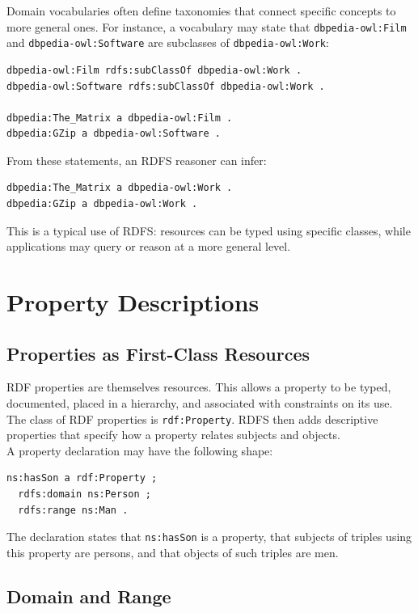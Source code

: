 \documentclass{scrbook}
\begin{document}
	Domain vocabularies often define taxonomies that connect specific concepts to more general ones. For instance, a vocabulary may state that \texttt{dbpedia-owl:Film} and \texttt{dbpedia-owl:Software} are subclasses of \texttt{dbpedia-owl:Work}:
	
	\begin{lstlisting}
dbpedia-owl:Film rdfs:subClassOf dbpedia-owl:Work .
dbpedia-owl:Software rdfs:subClassOf dbpedia-owl:Work .

dbpedia:The_Matrix a dbpedia-owl:Film .
dbpedia:GZip a dbpedia-owl:Software .
	\end{lstlisting}
	
	From these statements, an RDFS reasoner can infer:
	
	\begin{lstlisting}
dbpedia:The_Matrix a dbpedia-owl:Work .
dbpedia:GZip a dbpedia-owl:Work .
	\end{lstlisting}
	
	This is a typical use of RDFS: resources can be typed using specific classes, while applications may query or reason at a more general level.
	
	\section{Property Descriptions}
	
	\subsection{Properties as First-Class Resources}
	
	RDF properties are themselves resources. This allows a property to be typed, documented, placed in a hierarchy, and associated with constraints on its use. The class of RDF properties is \texttt{rdf:Property}. RDFS then adds descriptive properties that specify how a property relates subjects and objects.\\
	
	A property declaration may have the following shape:
	\begin{lstlisting}
ns:hasSon a rdf:Property ;
  rdfs:domain ns:Person ;
  rdfs:range ns:Man .
	\end{lstlisting}
	
	The declaration states that \texttt{ns:hasSon} is a property, that subjects of triples using this property are persons, and that objects of such triples are men.
	
	\subsection{Domain and Range}
	
\end{document}
